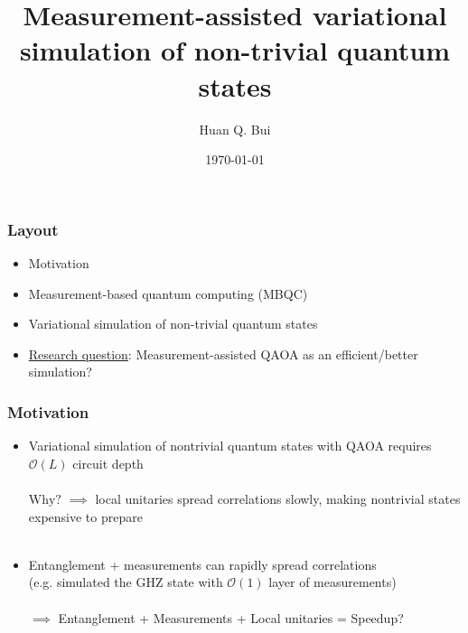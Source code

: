\documentclass{beamer}
\title{Measurement-assisted variational simulation of non-trivial quantum states}
\author[Huan Q. Bui] %
{Huan Q. Bui}
\institute[Perimeter Institute] %
{
	
	Advisor: Timothy Hsieh
	\and
	Perimeter Institute for Theoretical Physics
}
\date{\today}
\theoremstyle{definition}
\begin{document}
 
\frame{\titlepage}






\begin{frame}

\frametitle{Layout}

\begin{itemize}
	\item Motivation
	\item Measurement-based quantum computing (MBQC)
	\item Variational simulation of non-trivial quantum states
	\item \underline{Research question}: Measurement-assisted QAOA as an efficient/better simulation?
\end{itemize}

\end{frame}




\begin{frame}


\frametitle{Motivation}


\begin{itemize}
	\item Variational simulation of nontrivial quantum states with QAOA \cite{VQCS} requires $\mathcal{O}(L)$ circuit depth\\
	$\,$\\
	$\boxed{\text{Why?}}$ $\implies$ local unitaries spread correlations slowly, making nontrivial states expensive to prepare \\
	$\,$	
	
	\item Entanglement + measurements can rapidly spread correlations \\
	(e.g. simulated the GHZ state with $\mathcal{O}(1)$ layer of measurements)\\
	$\,$\\
	$\implies$ Entanglement + Measurements + Local unitaries = Speedup? 
	
\end{itemize}


\end{frame}



\end{document}
